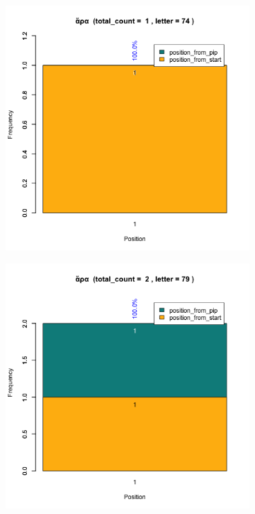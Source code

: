 \documentclass[a4paper]{article}
\begin{document}
\begin{figure}
\begin{subfigure}{0.45\textwidth}
\centering
\includegraphics[width=1\linewidth]{../../data/output/paul_R_par/plots/par13_lt74.png}
\end{subfigure}
\begin{subfigure}{0.45\textwidth}
\centering
\includegraphics[width=1\linewidth]{../../data/output/paul_R_par/plots/par13_lt79.png}
\end{subfigure}
\end{figure}
\end{document}
